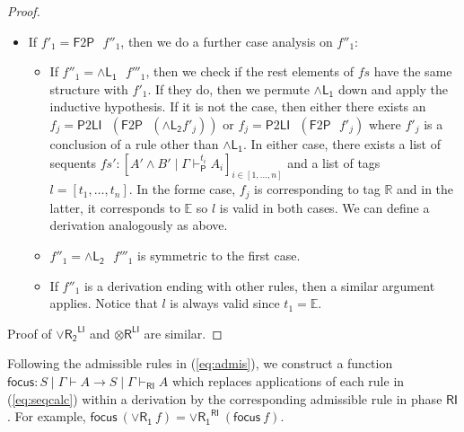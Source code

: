 \documentclass[submission,copyright,creativecommons]{eptcs}
\theoremstyle{definition}
\newcommand{\tr}{\otimes \mathsf{R}}
\newcommand{\andlone}{\land \mathsf{L_{1}}}
\newcommand{\andltwo}{\land \mathsf{L_{2}}}
\newcommand{\andli}{\land \mathsf{L}_{i}}
\newcommand{\andr}{\land \mathsf{R}}
\newcommand{\orrone}{\lor \mathsf{R_{1}}}
\newcommand{\orrtwo}{\lor \mathsf{R_{2}}}
\newcommand{\RI}{\mathsf{RI}}
\newcommand{\LI}{\mathsf{LI}}
\newcommand{\Pass}{\mathsf{P}}
\newcommand{\F}{\mathsf{F}}
\newcommand{\sw}{\mathsf{sw}}
\newcommand{\tR}{\mathbb{R}}
\newcommand{\tE}{\mathbb{E}}
\newcommand{\proofbox}[1]{\begin{tabular}{l} #1 \end{tabular}}
\begin{document}
\begin{proof}
\begin{itemize}
\begin{itemize}
\begin{itemize}
        The corresponding tag to $f'_j$ is $\tE$ because it is impossible to be a conclusion of any of $\andli$, so the validity of $l$ is justified.
        With $fs'$ and $l$ in hand, we define: 
        \begin{displaymath}
          \begin{array}{cc}
            \infer[\orrone^{\LI}]{- \mid A' , \Gamma \vdash_{\LI} A \lor B}{
              \deduce{[- \mid A' , \Gamma \vdash_{\LI} A_i]_{i \in [1 , \dots , n]}}{fs}
            }
            \\[10pt]
            &
            =
            \quad
            \proofbox{
            \infer[\sw]{- \mid A' , \Gamma \vdash_{\LI} A \lor B}{
              \infer[\orrone]{- \mid A' , \Gamma \vdash_{\F} A \lor B}{
                \infer[\andr^{*}_t]{- \mid A' , \Gamma \vdash^{l}_{\RI} A}{
                  \deduce{[- \mid A' , \Gamma \vdash^{t_i}_{\Pass} A_i]_{i \in [1 , \dots , n]}}{fs'}
                }
              }
            }
          }
          \end{array}
        \end{displaymath}
      \end{itemize}
      \item If $f'_1 = \F 2 \Pass \text{ } f''_1$, then we do a further case analysis on $f''_1$:
      \begin{itemize}
        \item If $f''_1 = \andlone \text{ } f'''_1$, then we check if the rest elements of $fs$ have the same structure with $f'_1$. If they do, then we permute $\andlone$ down and apply the inductive hypothesis.
        If it is not the case, then either there exists an $f_j = \Pass 2 \LI \text{ } (\F 2 \Pass \text{ } (\andltwo f'_j))$ or $f_j = \Pass 2 \LI \text{ } (\F 2 \Pass \text{ } f'_j)$ where $f'_j$ is a conclusion of a rule other than $\andlone$.
        In either case, there exists a list of sequents $fs' : [A' \land B' \mid \Gamma \vdash^{t_i}_{\Pass} A_i]_{i \in [1 , \dots , n]}$ and a list of tags $l = [t_1 , \dots , t_n]$.
        In the forme case, $f_j$ is corresponding to tag $\tR$ and in the latter, it corresponds to $\tE$ so $l$ is valid in both cases.
        We can define a derivation analogously as above.
        \item $f''_1 = \andltwo \text{ } f'''_1$ is symmetric to the first case.
        \item If $f''_1$ is a derivation ending with other rules, then a similar argument applies.
        Notice that $l$ is always valid since $t_1 = \tE$.
      \end{itemize}
    \end{itemize} 
  \end{itemize}
  Proof of $\orrtwo^{\LI}$ and $\tr^{\LI}$ are similar.
\end{proof}
Following the admissible rules in (\ref{eq:admis}), we construct a function $\mathsf{focus} : S \mid \Gamma \vdash A \to S \mid \Gamma \vdash_{\RI} A$ which replaces applications of each rule in (\ref{eq:seqcalc}) within a derivation by the corresponding admissible rule in phase $\RI$.
For example, $\mathsf{focus} \ (\orrone \ f) = \orrone^{\RI} \ (\mathsf{focus} \ f)$.
\end{document}
